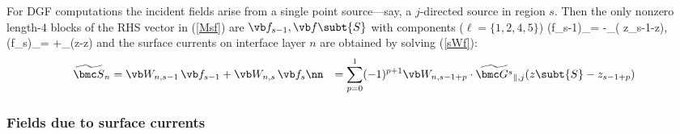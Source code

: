 \documentclass[letterpaper]{article}
\renewcommand{\wt}{\widetilde}
\begin{document}
For DGF computations the incident fields arise from
a single point source---say, a $j$-directed source
in region $s$.
Then the only nonzero length-$4$ blocks of the RHS vector in
(\ref{Msf}) are $\vb f_{s-1}, \vb f\subt{S}$ with components
($\ell=\{1,2,4,5\}$)
 { \Big(\vb f_{s-1}\Big)_\ell = -\wt {\mc G_{\ell j}^{s}}_{\parallel}( z_{s-1}-z),
   \qquad
   \Big(\vb f_{s}\Big)_\ell   = +\wt {\mc G_{\ell j}^s}_{\parallel}(z-z)
 }
and the surface currents on interface layer $n$ are obtained
by solving (\ref{sWf}):
\begin{align}
 \wt{\bmc S}_n 
&= \vb W_{n,s-1} \, \vb f_{s-1} + \vb W_{n,s} \, \vb f_{s}
\nn
&= \sum_{p=0}^1 (-1)^{p+1} \vb W_{n,s-1+p}
    \cdot
    \wt{\bmc G^s}_{\parallel, j}(z\subt{S}-z_{s-1+p})
\label{SWG}
\end{align}

\subsubsection*{Fields due to surface currents}
\end{document}

